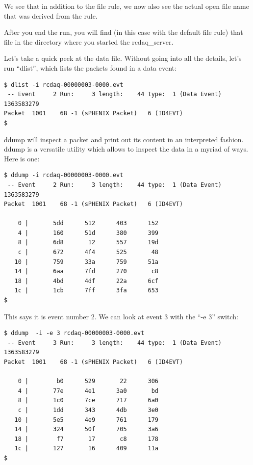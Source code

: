\documentclass{article}[11pt]
\begin{document}
We see that in addition to the file rule, we now also see the actual
open file name that was derived from the rule.

After you end the run, you will find (in this case with the default
file rule) that file in the directory where you started the
rcdaq\_server.

Let's take a quick peek at the data file. Without going into all the
details, let's run ``dlist'', which lists the packets found in a data
event:

\begin{verbatim}
$ dlist -i rcdaq-00000003-0000.evt 
 -- Event     2 Run:     3 length:    44 type:  1 (Data Event)  1363583279
Packet  1001    68 -1 (sPHENIX Packet)   6 (ID4EVT)
$
\end{verbatim}

ddump will inspect a packet and print out its content in an
interpreted fashion. ddump is a versatile utility which allows to
inspect the data in a myriad of ways. Here is one:

\begin{verbatim}
$ ddump -i rcdaq-00000003-0000.evt
 -- Event     2 Run:     3 length:    44 type:  1 (Data Event)  1363583279
Packet  1001    68 -1 (sPHENIX Packet)   6 (ID4EVT)

    0 |       5dd      512      403      152 
    4 |       160      51d      380      399 
    8 |       6d8       12      557      19d 
    c |       672      4f4      525       48 
   10 |       759      33a      759      51a 
   14 |       6aa      7fd      270       c8 
   18 |       4bd      4df      22a      6cf 
   1c |       1cb      7ff      3fa      653 
$ 
\end{verbatim}

This says it is event number 2. We can look at event 3 with the ``-e 3'' switch:

\begin{verbatim}
$ ddump  -i -e 3 rcdaq-00000003-0000.evt
 -- Event     3 Run:     3 length:    44 type:  1 (Data Event)  1363583279
Packet  1001    68 -1 (sPHENIX Packet)   6 (ID4EVT)

    0 |        b0      529       22      306 
    4 |       77e      4e1      3a0       bd 
    8 |       1c0      7ce      717      6a0 
    c |       1dd      343      4db      3e0 
   10 |       5e5      4e9      761      179 
   14 |       324      50f      705      3a6 
   18 |        f7       17       c8      178 
   1c |       127       16      409      11a 
$ 
\end{verbatim}
\end{document}
